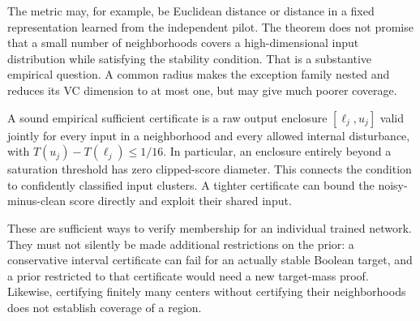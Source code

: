The metric may, for example, be Euclidean distance or distance in a fixed
representation learned from the independent pilot. The theorem does not
promise that a small number of neighborhoods covers a high-dimensional
input distribution while satisfying the stability condition. That is a
substantive empirical question. A common radius makes the exception family
nested and reduces its VC dimension to at most one, but may give much
poorer coverage.

A sound empirical sufficient certificate is a raw output enclosure
$[\ell_j,u_j]$ valid jointly for every input in a neighborhood and every
allowed internal disturbance, with
$T(u_j)-T(\ell_j)\le1/16$. In particular, an enclosure entirely beyond a
saturation threshold has zero clipped-score diameter. This connects the
condition to confidently classified input clusters. A tighter certificate
can bound the noisy-minus-clean score directly and exploit their shared
input.

These are sufficient ways to verify membership for an individual trained
network. They must not silently be made additional restrictions on the
prior: a conservative interval certificate can fail for an actually stable
Boolean target, and a prior restricted to that certificate would need a
new target-mass proof. Likewise, certifying finitely many centers without
certifying their neighborhoods does not establish coverage of a region.
